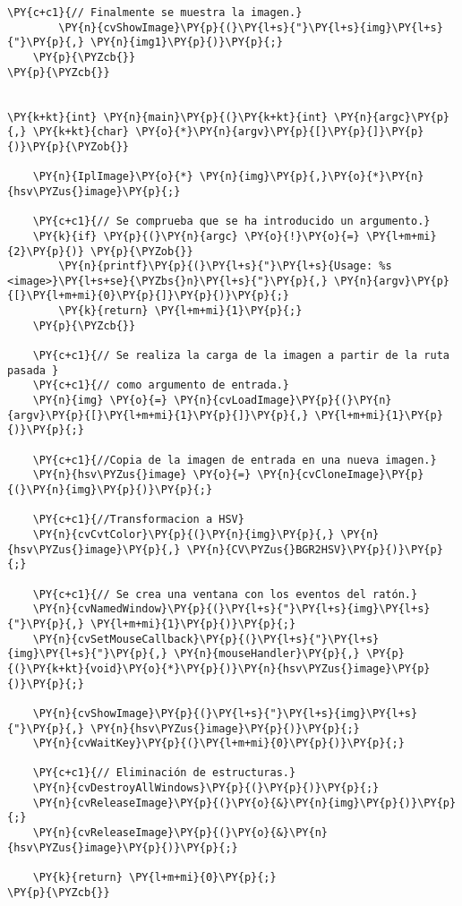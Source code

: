 \begin{Verbatim}[commandchars=\\\{\}]
        \PY{c+c1}{// Finalmente se muestra la imagen.}
        \PY{n}{cvShowImage}\PY{p}{(}\PY{l+s}{"}\PY{l+s}{img}\PY{l+s}{"}\PY{p}{,} \PY{n}{img1}\PY{p}{)}\PY{p}{;}
    \PY{p}{\PYZcb{}}
\PY{p}{\PYZcb{}}


\PY{k+kt}{int} \PY{n}{main}\PY{p}{(}\PY{k+kt}{int} \PY{n}{argc}\PY{p}{,} \PY{k+kt}{char} \PY{o}{*}\PY{n}{argv}\PY{p}{[}\PY{p}{]}\PY{p}{)}\PY{p}{\PYZob{}}

    \PY{n}{IplImage}\PY{o}{*} \PY{n}{img}\PY{p}{,}\PY{o}{*}\PY{n}{hsv\PYZus{}image}\PY{p}{;}

    \PY{c+c1}{// Se comprueba que se ha introducido un argumento.}
    \PY{k}{if} \PY{p}{(}\PY{n}{argc} \PY{o}{!}\PY{o}{=} \PY{l+m+mi}{2}\PY{p}{)} \PY{p}{\PYZob{}}
        \PY{n}{printf}\PY{p}{(}\PY{l+s}{"}\PY{l+s}{Usage: %s <image>}\PY{l+s+se}{\PYZbs{}n}\PY{l+s}{"}\PY{p}{,} \PY{n}{argv}\PY{p}{[}\PY{l+m+mi}{0}\PY{p}{]}\PY{p}{)}\PY{p}{;}
        \PY{k}{return} \PY{l+m+mi}{1}\PY{p}{;}
    \PY{p}{\PYZcb{}}

    \PY{c+c1}{// Se realiza la carga de la imagen a partir de la ruta pasada }
    \PY{c+c1}{// como argumento de entrada.}
    \PY{n}{img} \PY{o}{=} \PY{n}{cvLoadImage}\PY{p}{(}\PY{n}{argv}\PY{p}{[}\PY{l+m+mi}{1}\PY{p}{]}\PY{p}{,} \PY{l+m+mi}{1}\PY{p}{)}\PY{p}{;}

    \PY{c+c1}{//Copia de la imagen de entrada en una nueva imagen.}
    \PY{n}{hsv\PYZus{}image} \PY{o}{=} \PY{n}{cvCloneImage}\PY{p}{(}\PY{n}{img}\PY{p}{)}\PY{p}{;} 
    
    \PY{c+c1}{//Transformacion a HSV}
    \PY{n}{cvCvtColor}\PY{p}{(}\PY{n}{img}\PY{p}{,} \PY{n}{hsv\PYZus{}image}\PY{p}{,} \PY{n}{CV\PYZus{}BGR2HSV}\PY{p}{)}\PY{p}{;}

    \PY{c+c1}{// Se crea una ventana con los eventos del ratón.}
    \PY{n}{cvNamedWindow}\PY{p}{(}\PY{l+s}{"}\PY{l+s}{img}\PY{l+s}{"}\PY{p}{,} \PY{l+m+mi}{1}\PY{p}{)}\PY{p}{;}
    \PY{n}{cvSetMouseCallback}\PY{p}{(}\PY{l+s}{"}\PY{l+s}{img}\PY{l+s}{"}\PY{p}{,} \PY{n}{mouseHandler}\PY{p}{,} \PY{p}{(}\PY{k+kt}{void}\PY{o}{*}\PY{p}{)}\PY{n}{hsv\PYZus{}image}\PY{p}{)}\PY{p}{;}

    \PY{n}{cvShowImage}\PY{p}{(}\PY{l+s}{"}\PY{l+s}{img}\PY{l+s}{"}\PY{p}{,} \PY{n}{hsv\PYZus{}image}\PY{p}{)}\PY{p}{;}
    \PY{n}{cvWaitKey}\PY{p}{(}\PY{l+m+mi}{0}\PY{p}{)}\PY{p}{;}

    \PY{c+c1}{// Eliminación de estructuras.}
    \PY{n}{cvDestroyAllWindows}\PY{p}{(}\PY{p}{)}\PY{p}{;}
    \PY{n}{cvReleaseImage}\PY{p}{(}\PY{o}{&}\PY{n}{img}\PY{p}{)}\PY{p}{;}
    \PY{n}{cvReleaseImage}\PY{p}{(}\PY{o}{&}\PY{n}{hsv\PYZus{}image}\PY{p}{)}\PY{p}{;}

    \PY{k}{return} \PY{l+m+mi}{0}\PY{p}{;}
\PY{p}{\PYZcb{}}
\end{Verbatim}
